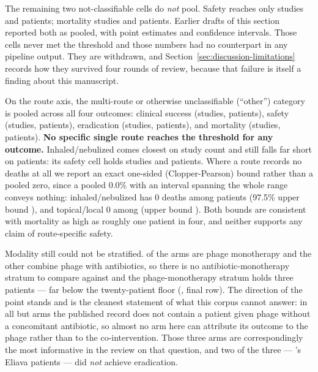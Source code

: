The remaining two not-classifiable cells do \emph{not} pool. Safety reaches only \SafResNotClassifiableK studies and \SafResNotClassifiableN patients; mortality \MortResNotClassifiableK studies and \MortResNotClassifiableN patients. Earlier drafts of this section reported both as pooled, with point estimates and confidence intervals. Those cells never met the threshold and those numbers had no counterpart in any pipeline output. They are withdrawn, and Section~\ref{sec:discussion-limitations} records how they survived four rounds of review, because that failure is itself a finding about this manuscript.

On the route axis, the multi-route or otherwise unclassifiable (``other'') category is pooled across all four outcomes: clinical success \CsRouteOtherEstCI (\CsRouteOtherK studies, \CsRouteOtherN patients), safety \SafRouteOtherEstCI (\SafRouteOtherK studies, \SafRouteOtherN patients), eradication \EradRouteOtherEstCI (\EradRouteOtherK studies, \EradRouteOtherN patients), and mortality \MortRouteOtherEstCI (\MortRouteOtherK studies, \MortRouteOtherN patients). \textbf{No specific single route reaches the threshold for any outcome.} Inhaled/nebulized comes closest on study count and still falls far short on patients: its safety cell holds \SafRouteInhaledNebulizedK studies and \SafRouteInhaledNebulizedN patients. Where a route records no deaths at all we report an exact one-sided (Clopper-Pearson) bound rather than a pooled zero, since a pooled 0.0\% with an interval spanning the whole range conveys nothing: inhaled/nebulized has 0 deaths among \MortZeroInhaledNebulizedN patients (97.5\% upper bound \MortZeroInhaledNebulizedCPupper), and topical/local 0 among \MortZeroTopicalLocalN (upper bound \MortZeroTopicalLocalCPupper). Both bounds are consistent with mortality as high as roughly one patient in four, and neither supports any claim of route-specific safety.  %

Modality still could not be stratified. \ModPhageMonotherapyArms of the \ArmsAnalysed arms are phage monotherapy and the other \ModPhageAntibioticCombinationArms combine phage with antibiotics, so there is no antibiotic-monotherapy stratum to compare against and the phage-monotherapy stratum holds three patients --- far below the twenty-patient floor (, final row). The direction of the point stands and is the cleanest statement of what this corpus cannot answer: in all but \ModPhageMonotherapyArms arms the published record does not contain a patient given phage without a concomitant antibiotic, so almost no arm here can attribute its outcome to the phage rather than to the co-intervention. Those three arms are correspondingly the most informative in the review on that question, and two of the three --- \citeauthor{Zaldastanishvili2021_viruses}'s Eliava patients --- did \emph{not} achieve eradication.

